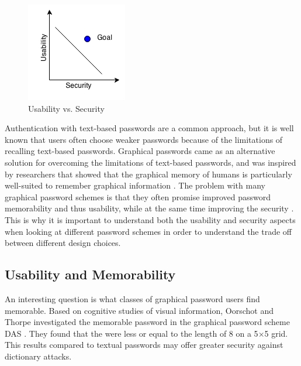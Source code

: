   \begin{figure}
    \vspace{-20pt}
    \begin{center}
      \includegraphics[scale=0.7]{pics/UsabilityVsSecurity.png}
    \end{center}
    \vspace{-20pt}
    \caption{Usability vs. Security}
    \vspace{-10pt}
  \end{figure}

  Authentication with text-based passwords are a common approach, but it is well known that users often choose weaker passwords because of the limitations of recalling text-based passwords. Graphical passwords came as an alternative solution for overcoming the limitations of text-based passwords, and was inspired by researchers that showed that the graphical memory of humans is particularly well-suited to remember graphical information \cite{DeAngeli}. The problem with many graphical password schemes is that they often promise improved password memorability and thus usability, while at the same time improving the security \cite{Biddle}. This is why it is important to understand both the usability and security aspects when looking at different password schemes in order to understand the trade off between different design choices.

\subsection{Usability and Memorability}


  An interesting question is what classes of graphical password users find memorable. Based on cognitive studies of visual information, Oorschot and Thorpe \cite{Thorpe1} investigated the memorable password in the graphical password scheme DAS \cite{Jermyn}. They found that the were less or equal to the length of 8 on a 5$\times$5 grid. This results compared to textual passwords may offer greater security against dictionary attacks. 


